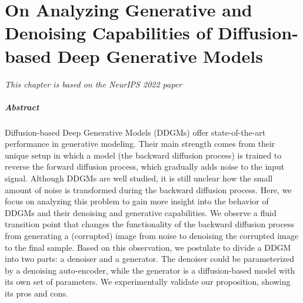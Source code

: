 



\chapter[On Analyzing Generative and Denoising Capabilities of DDGMs]{On Analyzing Generative and Denoising Capabilities of Diffusion-based Deep Generative Models}\label{chap:daed}

%

\begin{flushright}
	\small{
		\textit{
			\hfill This chapter is based on the NeurIPS 2022 paper \citep{deja2022analyzing} 
		} 
		
	}
\end{flushright}

\paragraph{Abstract}

Diffusion-based Deep Generative Models (DDGMs) offer state-of-the-art performance in generative modeling. Their main strength comes from their unique setup in which a model (the backward diffusion process) is trained to reverse the forward diffusion process, which gradually adds noise to the input signal. Although DDGMs are well studied, it is still unclear how the small amount of noise is transformed during the backward diffusion process. 
Here, we focus on analyzing this problem to gain more insight into the behavior of DDGMs and their denoising and generative capabilities. We observe a fluid transition point that changes the functionality of the backward diffusion process from generating a (corrupted) image from noise to denoising the corrupted image to the final sample. Based on this observation, we postulate to divide a DDGM into two parts: a denoiser and a generator. The denoiser could be parameterized by a denoising auto-encoder, while the generator is a diffusion-based model with its own set of parameters. We experimentally validate our proposition, showing its pros and cons.

